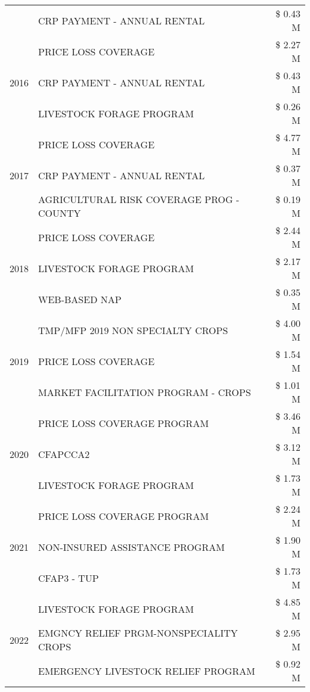 \begin{tabular}{llr}
 & CRP PAYMENT - ANNUAL RENTAL & \$ 0.43 M \\
\cline{1-3}
\multirow[t]{3}{*}{2016} & PRICE LOSS COVERAGE & \$ 2.27 M \\
 & CRP PAYMENT - ANNUAL RENTAL & \$ 0.43 M \\
 & LIVESTOCK FORAGE PROGRAM & \$ 0.26 M \\
\cline{1-3}
\multirow[t]{3}{*}{2017} & PRICE LOSS COVERAGE & \$ 4.77 M \\
 & CRP PAYMENT - ANNUAL RENTAL & \$ 0.37 M \\
 & AGRICULTURAL RISK COVERAGE PROG - COUNTY & \$ 0.19 M \\
\cline{1-3}
\multirow[t]{3}{*}{2018} & PRICE LOSS COVERAGE & \$ 2.44 M \\
 & LIVESTOCK FORAGE PROGRAM & \$ 2.17 M \\
 & WEB-BASED NAP & \$ 0.35 M \\
\cline{1-3}
\multirow[t]{3}{*}{2019} & TMP/MFP 2019 NON SPECIALTY CROPS & \$ 4.00 M \\
 & PRICE LOSS COVERAGE & \$ 1.54 M \\
 & MARKET FACILITATION PROGRAM - CROPS & \$ 1.01 M \\
\cline{1-3}
\multirow[t]{3}{*}{2020} & PRICE LOSS COVERAGE PROGRAM & \$ 3.46 M \\
 & CFAPCCA2 & \$ 3.12 M \\
 & LIVESTOCK FORAGE PROGRAM & \$ 1.73 M \\
\cline{1-3}
\multirow[t]{3}{*}{2021} & PRICE LOSS COVERAGE PROGRAM & \$ 2.24 M \\
 & NON-INSURED ASSISTANCE PROGRAM & \$ 1.90 M \\
 & CFAP3 - TUP & \$ 1.73 M \\
\cline{1-3}
\multirow[t]{3}{*}{2022} & LIVESTOCK FORAGE PROGRAM & \$ 4.85 M \\
 & EMGNCY RELIEF PRGM-NONSPECIALITY CROPS & \$ 2.95 M \\
 & EMERGENCY LIVESTOCK RELIEF PROGRAM & \$ 0.92 M \\
\cline{1-3}
\bottomrule
\end{tabular}
